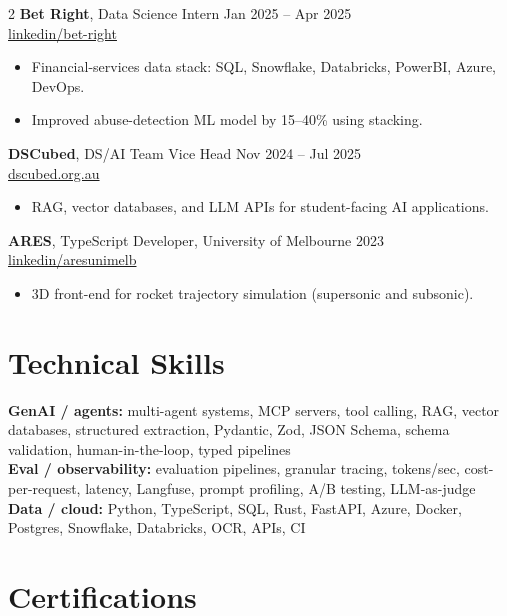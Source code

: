 \documentclass[10pt, a4paper]{article}
\begin{document}
\begin{multicols}{2}
\textbf{Bet Right}, Data Science Intern \hfill Jan 2025 -- Apr 2025 \\
\href{https://www.linkedin.com/company/bet-right/}{linkedin/bet-right}
\begin{itemize}
  \item Financial-services data stack: SQL, Snowflake, Databricks, PowerBI, Azure, DevOps.
  \item Improved abuse-detection ML model by 15--40\% using stacking.
\end{itemize}

\textbf{DSCubed}, DS/AI Team Vice Head \hfill Nov 2024 -- Jul 2025 \\
\href{https://www.dscubed.org.au/}{dscubed.org.au}
\begin{itemize}
  \item RAG, vector databases, and LLM APIs for student-facing AI applications.
\end{itemize}

\textbf{ARES}, TypeScript Developer, University of Melbourne \hfill 2023 \\
\href{https://www.linkedin.com/company/aresunimelb}{linkedin/aresunimelb}
\begin{itemize}
  \item 3D front-end for rocket trajectory simulation (supersonic and subsonic).
\end{itemize}

\section{Technical Skills}

\textbf{GenAI / agents:} multi-agent systems, MCP servers, tool calling, RAG, vector databases, structured extraction, Pydantic, Zod, JSON Schema, schema validation, human-in-the-loop, typed pipelines \\
\textbf{Eval / observability:} evaluation pipelines, granular tracing, tokens/sec, cost-per-request, latency, Langfuse, prompt profiling, A/B testing, LLM-as-judge \\
\textbf{Data / cloud:} Python, TypeScript, SQL, Rust, FastAPI, Azure, Docker, Postgres, Snowflake, Databricks, OCR, APIs, CI

\section{Certifications}


\end{multicols}
\end{document}
